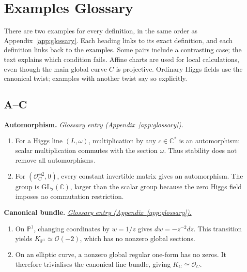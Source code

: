 \documentclass[11pt,a4paper]{article}
\numberwithin{equation}{section}
\theoremstyle{definition}
\newcommand{\OO}{\mathcal O}
\begin{document}
\clearpage
\section{Examples Glossary}
\label{app:examples-glossary}

There are two examples for every definition, in the same order as
Appendix~\ref{app:glossary}. Each heading links to its exact definition,
and each definition links back to the examples. Some pairs include a
contrasting case; the text explains which condition fails. Affine charts
are used for local calculations, even though the main global curve $C$
is projective. Ordinary Higgs fields use the canonical twist;
examples with another twist say so explicitly.

\newcommand{\examplegloss}[3]{%
  \par\medskip\Needspace{5\baselineskip}\phantomsection\label{examples:#1}%
  \noindent\textbf{#2.}\quad
  \hyperref[gloss:#1]{\textit{Glossary entry (Appendix~\ref*{app:glossary}).}}\par
  #3\par}

\subsection*{A--C}

\examplegloss{automorphism}{Automorphism}{
\begin{enumerate}[label=(\arabic*),leftmargin=*,itemsep=2pt,topsep=3pt]
\item For a Higgs line $(L,\omega)$, multiplication by any $c\in\mathbb C^*$ is an automorphism: scalar multiplication commutes with the section $\omega$. Thus stability does not remove all automorphisms.
\item For $(\OO_C^{\oplus2},0)$, every constant invertible matrix gives an automorphism. The group is $\mathrm{GL}_2(\mathbb C)$, larger than the scalar group because the zero Higgs field imposes no commutation restriction.
\end{enumerate}}

\examplegloss{canonical-bundle}{Canonical bundle}{
\begin{enumerate}[label=(\arabic*),leftmargin=*,itemsep=2pt,topsep=3pt]
\item On $\mathbb P^1$, changing coordinates by $w=1/z$ gives $dw=-z^{-2}dz$. This transition yields $K_{\mathbb P^1}\simeq\OO(-2)$, which has no nonzero global sections.
\item On an elliptic curve, a nonzero global regular one-form has no zeros. It therefore trivialises the canonical line bundle, giving $K_C\simeq\OO_C$.
\end{enumerate}}
\end{document}
